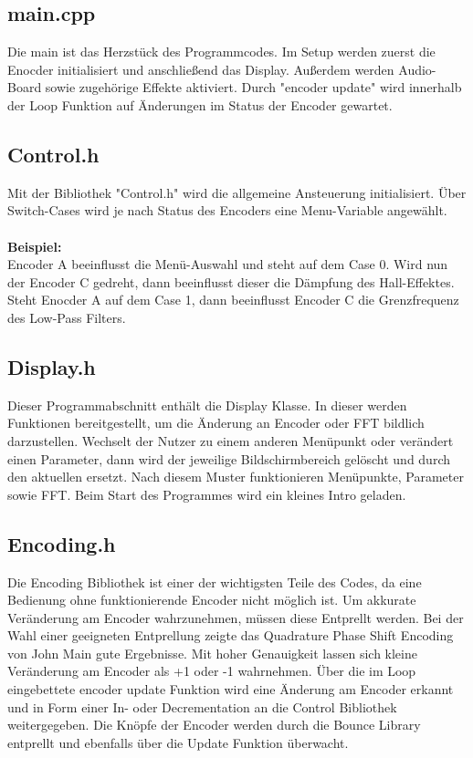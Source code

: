 \documentclass[12pt]{article}
\begin{document}
\subsection{main.cpp}
Die main ist das Herzstück des Programmcodes. Im Setup werden zuerst die Enocder initialisiert und anschließend das Display. 
Außerdem werden Audio-Board sowie zugehörige Effekte aktiviert. 
Durch "encoder update" wird innerhalb der Loop Funktion auf Änderungen im Status der Encoder gewartet.
\subsection{Control.h}
Mit der Bibliothek "Control.h" wird die allgemeine Ansteuerung initialisiert. Über Switch-Cases wird je nach Status des Encoders eine Menu-Variable angewählt. 
\\
\\
\textbf{Beispiel:}
\\
Encoder A beeinflusst die Menü-Auswahl und steht auf dem Case 0. Wird nun der Encoder C gedreht, dann beeinflusst dieser die Dämpfung des Hall-Effektes.
Steht Enocder A auf dem Case 1, dann beeinflusst Encoder C die Grenzfrequenz des Low-Pass Filters.
\subsection{Display.h}
Dieser Programmabschnitt enthält die Display Klasse. In dieser werden Funktionen bereitgestellt, um die Änderung an Encoder oder FFT bildlich darzustellen.  
Wechselt der Nutzer zu einem anderen Menüpunkt oder verändert einen Parameter, dann wird der jeweilige Bildschirmbereich gelöscht und durch den aktuellen ersetzt. 
Nach diesem Muster funktionieren Menüpunkte, Parameter sowie FFT. Beim Start des Programmes wird ein kleines Intro geladen.

\subsection{Encoding.h}
Die Encoding Bibliothek ist einer der wichtigsten Teile des Codes, da eine Bedienung ohne funktionierende Encoder nicht möglich ist. Um akkurate Veränderung am Encoder wahrzunehmen, 
müssen diese Entprellt werden. Bei der Wahl einer geeigneten Entprellung zeigte das Quadrature Phase Shift Encoding von John Main gute Ergebnisse. Mit hoher Genauigkeit lassen sich 
kleine Veränderung am Encoder als +1 oder -1 wahrnehmen. Über die im Loop eingebettete encoder update Funktion wird eine Änderung am Encoder erkannt und in Form einer In- oder Decrementation an die Control 
Bibliothek weitergegeben. Die Knöpfe der Encoder werden durch die Bounce Library entprellt und ebenfalls über die Update Funktion überwacht.   
\end{document}
